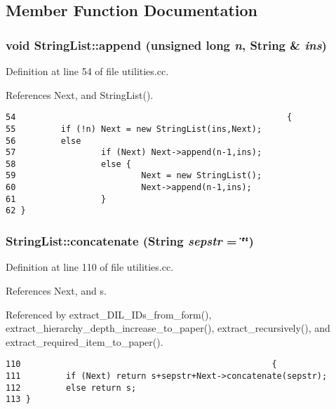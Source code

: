 \subsection{Member Function Documentation}
\subsubsection{\setlength{\rightskip}{0pt plus 5cm}void String\-List::append (unsigned long {\em n}, {\bf String} \& {\em ins})}\label{classStringList_a8}




Definition at line 54 of file utilities.cc.

References Next, and String\-List().



\footnotesize\begin{verbatim}54                                                      {
55         if (!n) Next = new StringList(ins,Next);
56         else
57                 if (Next) Next->append(n-1,ins);
58                 else {
59                         Next = new StringList();
60                         Next->append(n-1,ins);
61                 }
62 }
\end{verbatim}\normalsize 
{}
\subsubsection{ String\-List::concatenate ({\bf String} {\em sepstr} = \char`\"{}\char`\"{})}\label{classStringList_a15}




Definition at line 110 of file utilities.cc.

References Next, and s.

Referenced by extract\_\-DIL\_\-IDs\_\-from\_\-form(), extract\_\-hierarchy\_\-depth\_\-increase\_\-to\_\-paper(), extract\_\-recursively(), and extract\_\-required\_\-item\_\-to\_\-paper().



\footnotesize\begin{verbatim}110                                                  {
111         if (Next) return s+sepstr+Next->concatenate(sepstr);
112         else return s;
113 }
\end{verbatim}\normalsize 
{}
